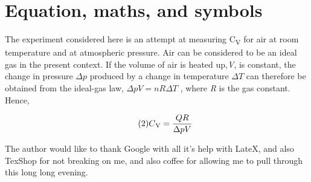 \documentclass[twocolumn]{revtex4}
\begin{document}
\section{Equation, maths, and symbols} 
\vspace{-2ex}

The experiment considered here is an attempt at measuring C\textsubscript{V} for air at room temperature and at atmospheric pressure. Air can be considered to be an ideal gas in the present context. If the volume of air is heated up,\textit{V}, is constant, the change in pressure $\Delta p$ produced by a change in temperature $\Delta T$ can therefore be obtained from the ideal-gas law, $\Delta pV = \textit{nR$\Delta T$} $ , where \textit{R} is the gas constant. Hence, 


\begin{equation} \tag{2}
C\textsubscript{V} = \frac{QR}{\Delta pV}\\
\end{equation}


 
\vspace{-3ex}
\begin{acknowledgements}
\vspace{-3ex}
The author would like to thank Google with all it's help with LateX, and also TexShop for not breaking on me, and also coffee for allowing me to pull through this long long evening.
\end{acknowledgements}
\end{document}
